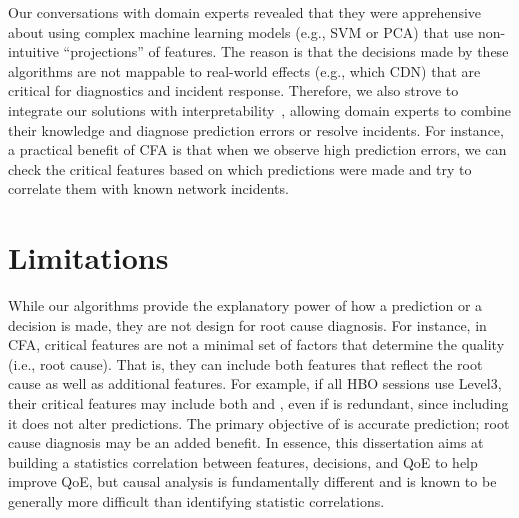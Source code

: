 


Our conversations with domain experts revealed that they 
were apprehensive about using complex machine learning 
models (e.g., SVM or PCA) that use non-intuitive ``projections'' 
of features. The reason is that the decisions made by these 
algorithms are not mappable 
to real-world effects (e.g., which CDN) that are 
critical for diagnostics and incident response.
Therefore, we also strove to integrate our solutions with
interpretability~\cite{vellido2012making}, 
allowing domain experts to combine
their knowledge and diagnose prediction
errors or resolve incidents.
For instance, a practical benefit of CFA is that when we observe
high prediction errors, we can check the critical features
based on which predictions were made and try to correlate them 
with known network incidents.


\section{Limitations}
\label{sec:concl:limitations}

While our algorithms provide the explanatory power of how a 
prediction or a decision is made, they are not design for 
root cause diagnosis.
For instance, in CFA, critical features are not a minimal set of
factors that determine the quality (i.e., root cause).
That is, they can include both features that reflect
the root cause as well as additional features.
For example, if all HBO sessions use Level3, their
critical features may include both \fCDN and \fSite,
even if \fCDN is redundant, since including it does
not alter predictions.
The primary objective of \dda is accurate prediction;
root cause diagnosis may be an added benefit.
In essence, this dissertation aims at building a 
statistics correlation between features, decisions,
and QoE to help improve QoE, but causal analysis is 
fundamentally different and is known to be generally
more difficult than identifying statistic correlations.

